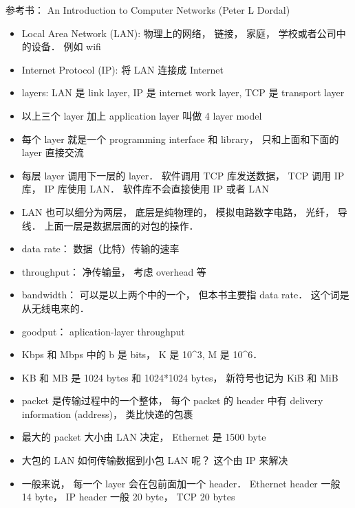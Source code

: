 
\begin{issues}
\issueDraft
\end{issues}

参考书： An Introduction to Computer Networks (Peter L Dordal)
\begin{itemize}
\item Local Area Network (LAN): 物理上的网络， 链接， 家庭， 学校或者公司中的设备． 例如 wifi
\item Internet Protocol (IP): 将 LAN 连接成 Internet
\item layers: LAN 是 link layer, IP 是 internet work layer, TCP 是 transport layer
\item 以上三个 layer 加上 application layer 叫做 4 layer model
\item 每个 layer 就是一个 programming interface 和 library， 只和上面和下面的 layer 直接交流
\item 每层 layer 调用下一层的 layer． 软件调用 TCP 库发送数据， TCP 调用 IP 库， IP 库使用 LAN． 软件库不会直接使用 IP 或者 LAN
\item LAN 也可以细分为两层， 底层是纯物理的， 模拟电路数字电路， 光纤， 导线． 上面一层是数据层面的对包的操作．
\item data rate： 数据（比特）传输的速率
\item throughput： 净传输量， 考虑 overhead 等
\item bandwidth： 可以是以上两个中的一个， 但本书主要指 data rate． 这个词是从无线电来的．
\item goodput： aplication-layer throughput
\item Kbps 和 Mbps 中的 b 是 bits， K 是 10^3, M 是 10^6．
\item KB 和 MB 是 1024 bytes 和 1024*1024 bytes， 新符号也记为 KiB 和 MiB
\item packet 是传输过程中的一个整体， 每个 packet 的 header 中有 delivery information (address)， 类比快递的包裹
\item 最大的 packet 大小由 LAN 决定， Ethernet 是 1500 byte
\item 大包的 LAN 如何传输数据到小包 LAN 呢？ 这个由 IP 来解决
\item 一般来说， 每一个 layer 会在包前面加一个 header． Ethernet header 一般 14 byte， IP header 一般 20 byte， TCP 20 bytes
\end{itemize}

